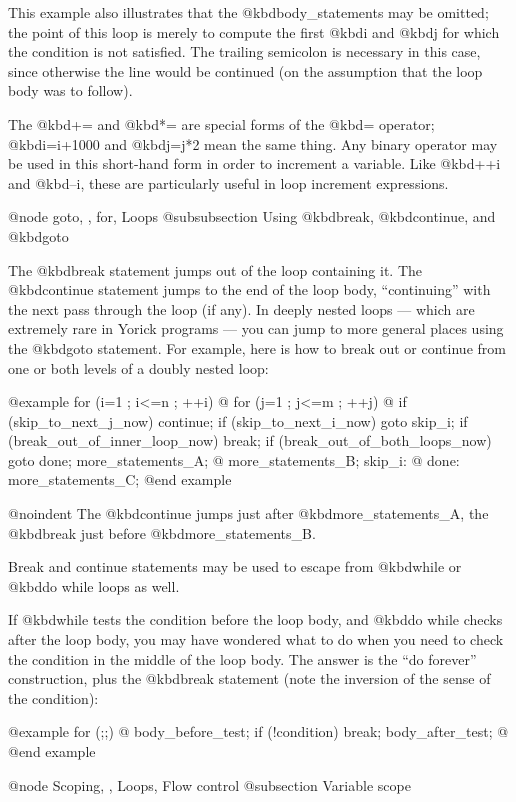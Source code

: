 {This example also illustrates that the @kbd{body_statements} may be
omitted; the point of this loop is merely to compute the first @kbd{i}
and @kbd{j} for which the condition is not satisfied.  The trailing
semicolon is necessary in this case, since otherwise the line would
be continued (on the assumption that the loop body was to follow).


The @kbd{+=} and @kbd{*=} are special forms of the @kbd{=} operator;
@kbd{i=i+1000} and @kbd{j=j*2} mean the same thing.  Any binary
operator may be used in this short-hand form in order to increment a
variable.  Like @kbd{++i} and @kbd{--i}, these are particularly useful
in loop increment expressions.


@node goto,  , for, Loops
@subsubsection Using @kbd{break}, @kbd{continue}, and @kbd{goto}

The @kbd{break} statement jumps out of the loop containing it.  The
@kbd{continue} statement jumps to the end of the loop body,
``continuing'' with the next pass through the loop (if any).  In
deeply nested loops --- which are extremely rare in Yorick programs
--- you can jump to more general places using the @kbd{goto}
statement.  For example, here is how to break out or continue from one
or both levels of a doubly nested loop:

@example
 for (i=1 ; i<=n ; ++i) @{
   for (j=1 ; j<=m ; ++j) @{
     if (skip_to_next_j_now) continue;
     if (skip_to_next_i_now) goto skip_i;
     if (break_out_of_inner_loop_now) break;
     if (break_out_of_both_loops_now) goto done;
     more_statements_A;
   @}
   more_statements_B;
  skip_i:
 @}
done:
 more_statements_C;
@end example

@noindent
The @kbd{continue} jumps just after @kbd{more_statements_A}, the
@kbd{break} just before @kbd{more_statements_B}.

Break and continue statements may be used to escape from @kbd{while}
or @kbd{do while} loops as well.

If @kbd{while} tests the condition before the loop body, and @kbd{do
while} checks after the loop body, you may have wondered what to do
when you need to check the condition in the middle of the loop body.
The answer is the ``do forever'' construction, plus the @kbd{break}
statement (note the inversion of the sense of the condition):

@example
for (;;) @{
  body_before_test;
  if (!condition) break;
  body_after_test;
@}
@end example


@node Scoping,  , Loops, Flow control
@subsection Variable scope

}
